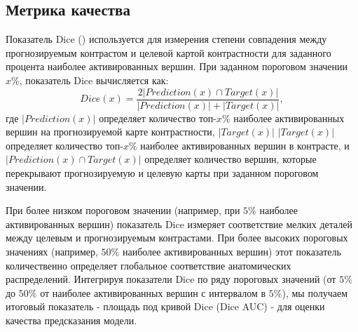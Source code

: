 \subsection{Метрика качества}
Показатель Dice (\cite{dice1945measures}) используется для измерения степени совпадения между прогнозируемым контрастом и целевой картой контрастности для заданного процента наиболее активированных вершин.
При заданном пороговом значении $x\%$, показатель Dice вычисляется как:
\begin{equation}
    Dice(x) = \frac{2 | Prediction(x) \cap Target(x)|}{| Prediction(x) | + | Target(x)|},
\end{equation}
где $| Prediction(x) |$ определяет  количество топ-$x\%$ наиболее активированных вершин на прогнозируемой карте контрастности, $| Target(x)|$ $| Target(x)|$ определяет количество топ-$x\%$ наиболее активированных вершин в контрасте, и $| Prediction(x) \cap Target(x)|$ определяет количество вершин, которые перекрывают прогнозируемую и целевую карты при заданном пороговом значении. 

При более низком пороговом значении (например, при $5\%$ наиболее активированных вершин) показатель Dice измеряет соответствие мелких деталей между целевым и прогнозируемым контрастами.
При более высоких пороговых значениях (например, $50\%$ наиболее активированных вершин) этот показатель количественно определяет глобальное соответствие анатомических распределений.
Интегрируя показатели Dice по ряду пороговых значений (от $5\%$ до $50\%$ от наиболее активированных вершин с интервалом в $5\%$), мы получаем итоговый показатель - площадь под кривой Dice (Dice AUC) -
для оценки качества предсказания модели.

